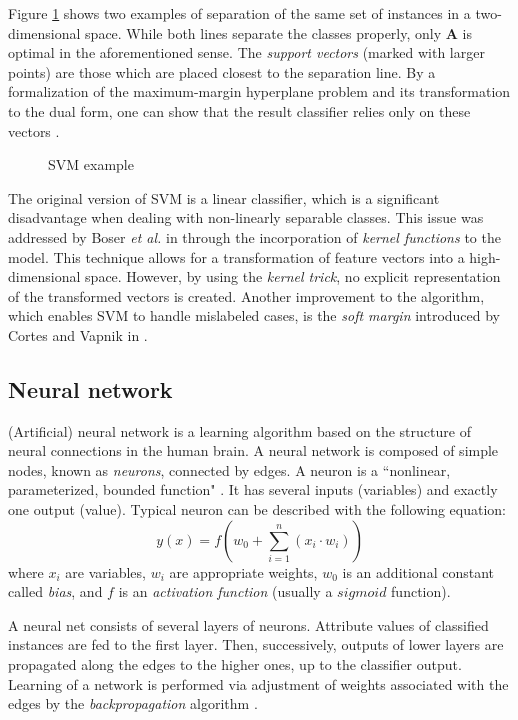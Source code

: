 \documentclass{pracamgr}
\begin{document}
Figure \ref{fig:svm} shows two examples of separation of the same set of instances in a two-dimensional space. While both lines separate the classes properly, only \textbf{A} is optimal in the aforementioned sense. The \emph{support vectors} (marked with larger points) are those which are placed closest to the separation line. By a formalization of the maximum-margin hyperplane problem and its transformation to the dual form, one can show that the result classifier relies only on these vectors \cite[pp. 942--944]{encyclopedia}.

\begin{figure}[h]
\centering

\caption{SVM example}
\label{fig:svm}
\end{figure}

The original version of SVM is a linear classifier, which is a significant disadvantage when dealing with non-linearly separable classes. This issue was addressed by Boser \emph{et al.} in \cite{Boser} through the incorporation of \emph{kernel functions} to the model. This technique allows for a transformation of feature vectors into a high-dimensional space. However, by using the \emph{kernel trick}, no explicit representation of the transformed vectors is created. Another improvement to the algorithm, which enables SVM to handle mislabeled cases, is the \emph{soft margin} introduced by Cortes and Vapnik in \cite{Cortes}.

\subsection{Neural network}
\label{sec:neural_net}

(Artificial) neural network is a learning algorithm based on the structure of neural connections in the human brain. A neural network is composed of simple nodes, known as \emph{neurons}, connected by edges. A neuron is a ``nonlinear, parameterized, bounded function" \cite[p. 2]{neural_networks}. It has several inputs (variables) and exactly one output (value). Typical neuron can be described with the following equation:
\[y(x) = f\left(w_0 + \sum\limits_{i = 1}^{n} (x_i \cdot w_i) \right)\]
where $x_i$ are variables, $w_i$ are appropriate weights, $w_0$ is an additional constant called \emph{bias}, and $f$ is an \emph{activation function} (usually a $sigmoid$ function).

A neural net consists of several layers of neurons. Attribute values of classified instances are fed to the first layer. Then, successively, outputs of lower layers are propagated along the edges to the higher ones, up to the classifier output. Learning of a network is performed via adjustment of weights associated with the edges by the \emph{backpropagation} algorithm \cite[p. 31]{neural_networks}.
\end{document}
